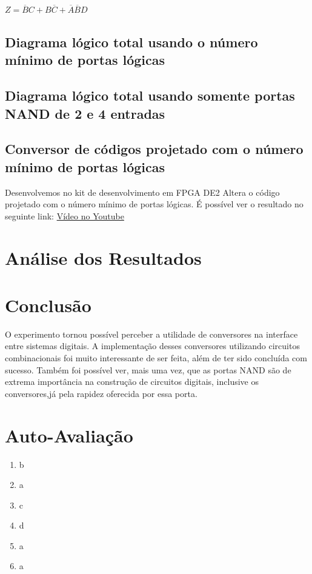 \documentclass[12pt]{article}
\begin{document}
$ Z = \overline{B}C + B\overline{C} + \overline{A}\overline{B}D$

\subsection{Diagrama lógico total usando o número mínimo de portas lógicas}
\label{sec:minimoporta}

\subsection{Diagrama lógico total usando somente portas NAND de 2 e 4 entradas}
\label{sec:nandporta}

\subsection{Conversor de códigos projetado com o número mínimo de portas lógicas}
\label{sec:conversor}

Desenvolvemos no kit de desenvolvimento em FPGA DE2 Altera o código projetado com o número mínimo de portas lógicas. É possível ver o resultado no seguinte link: \href{https://www.youtube.com/watch?v=1CFXa6bdLcs}{Vídeo no Youtube}



\section{Análise dos Resultados}
\label{sec:Resultados}


\section{Conclusão}
\label{sec:Conclusao}

O experimento tornou possível perceber a utilidade de conversores na interface entre sistemas digitais. A implementação desses conversores utilizando circuitos combinacionais foi muito interessante de ser feita, além de ter sido concluída com sucesso. Também foi possível ver, mais uma vez, que as portas NAND são de extrema importância na construção de circuitos digitais, inclusive os conversores,já pela rapidez oferecida por essa porta.






\newpage 
\section*{Auto-Avaliação}

\begin{enumerate}
    \item b
    \item a
    \item c
    \item d
    \item a
    \item a
\end{enumerate}
\end{document}
